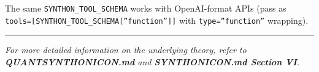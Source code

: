 \documentclass[12pt,a4paper]{article}
\begin{document}
The same \texttt{SYNTHON\_TOOL\_SCHEMA} works with OpenAI-format APIs (pass as \texttt{tools={[}SYNTHON\_TOOL\_SCHEMA{[}''function''{]}{]}} with \texttt{type=''function''} wrapping).

\begin{center}
\rule{0.5\textwidth}{0.4pt}
\end{center}

\emph{For more detailed information on the underlying theory, refer to \textbf{QUANTSYNTHONICON.md} and \textbf{SYNTHONICON.md Section VI}.}
\end{document}
